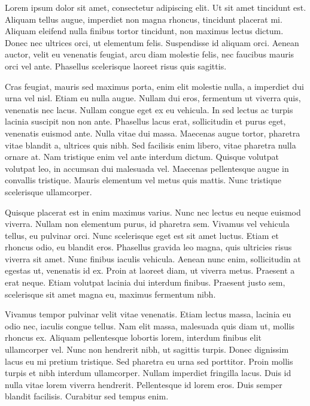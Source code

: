 \documentclass[conference]{IEEEtran}
\begin{document}
Lorem ipsum dolor sit amet, consectetur adipiscing elit. Ut sit amet tincidunt est. Aliquam tellus augue, imperdiet non magna rhoncus, tincidunt placerat mi. Aliquam eleifend nulla finibus tortor tincidunt, non maximus lectus dictum. Donec nec ultrices orci, ut elementum felis. Suspendisse id aliquam orci. Aenean auctor, velit eu venenatis feugiat, arcu diam molestie felis, nec faucibus mauris orci vel ante. Phasellus scelerisque laoreet risus quis sagittis.

Cras feugiat, mauris sed maximus porta, enim elit molestie nulla, a imperdiet dui urna vel nisl. Etiam eu nulla augue. Nullam dui eros, fermentum ut viverra quis, venenatis nec lacus. Nullam congue eget ex eu vehicula. In sed lectus ac turpis lacinia suscipit non non ante. Phasellus lacus erat, sollicitudin et purus eget, venenatis euismod ante. Nulla vitae dui massa. Maecenas augue tortor, pharetra vitae blandit a, ultrices quis nibh. Sed facilisis enim libero, vitae pharetra nulla ornare at. Nam tristique enim vel ante interdum dictum. Quisque volutpat volutpat leo, in accumsan dui malesuada vel. Maecenas pellentesque augue in convallis tristique. Mauris elementum vel metus quis mattis. Nunc tristique scelerisque ullamcorper.

Quisque placerat est in enim maximus varius. Nunc nec lectus eu neque euismod viverra. Nullam non elementum purus, id pharetra sem. Vivamus vel vehicula tellus, eu pulvinar orci. Nunc scelerisque eget est sit amet luctus. Etiam et rhoncus odio, eu blandit eros. Phasellus gravida leo magna, quis ultricies risus viverra sit amet. Nunc finibus iaculis vehicula. Aenean nunc enim, sollicitudin at egestas ut, venenatis id ex. Proin at laoreet diam, ut viverra metus. Praesent a erat neque. Etiam volutpat lacinia dui interdum finibus. Praesent justo sem, scelerisque sit amet magna eu, maximus fermentum nibh.

Vivamus tempor pulvinar velit vitae venenatis. Etiam lectus massa, lacinia eu odio nec, iaculis congue tellus. Nam elit massa, malesuada quis diam ut, mollis rhoncus ex. Aliquam pellentesque lobortis lorem, interdum finibus elit ullamcorper vel. Nunc non hendrerit nibh, ut sagittis turpis. Donec dignissim lacus eu mi pretium tristique. Sed pharetra eu urna sed porttitor. Proin mollis turpis et nibh interdum ullamcorper. Nullam imperdiet fringilla lacus. Duis id nulla vitae lorem viverra hendrerit. Pellentesque id lorem eros. Duis semper blandit facilisis. Curabitur sed tempus enim.
\end{document}
